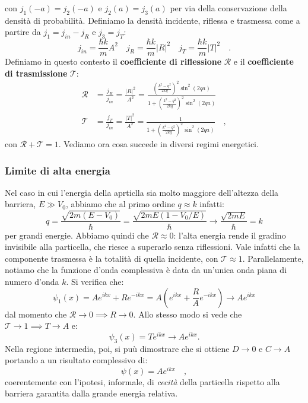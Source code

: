 con $j_1(-a) = j_2(-a)$ e $j_2(a) = j_3(a)$ per via della conservazione della densità di probabilità. Definiamo la densità incidente, riflessa e trasmessa come a partire da $j_1 = j_{in} - j_R$ e $j_3 = j_T$:
\[
    j_{in} = \frac{\hbar k}{m} A^2 \quad j_R = \frac{\hbar k}{m} |R|^2 \quad j_T = \frac{\hbar k}{m} |T|^2 \quad. 
\]
Definiamo in questo contesto il \textbf{coefficiente di riflessione} $\mathcal{R}$ e il \textbf{coefficiente di trasmissione} $\mathcal{T}$:
\[
\begin{aligned}
    \mathcal{R} &= \frac{j_R}{j_{in}} = \frac{|R|^2}{A^2} = \frac{\left( \frac{k^2-q^2}{2kq} \right)^2 \sin^2(2qa)}{1 + \left( \frac{k^2-q^2}{2kq} \right)^2 \sin^2(2qa)} \\
    \mathcal{T} &= \frac{j_T}{j_{in}} = \frac{|T|^2}{A^2} = \frac{1}{1 + \left( \frac{k^2-q^2}{2kq} \right)^2 \sin^2(2qa)} \quad,
\end{aligned}
\]
con $\mathcal{R} + \mathcal{T} = 1$. Vediamo ora cosa succede in diversi regimi energetici.

\subsubsection{Limite di alta energia}
Nel caso in cui l'energia della aprticlla sia molto maggiore dell'altezza della barriera, $E \gg V_0$, abbiamo che al primo ordine $q \approx k$ infatti:
\[
    q = \frac{\sqrt{2m(E-V_0)}}{\hbar} = \frac{\sqrt{2mE(1-V_0/E)}}{\hbar} \to \frac{\sqrt{2mE}}{\hbar} = k 
\]
per grandi energie. Abbiamo quindi che $\mathcal{R} \approx 0$: l'alta energia rende il gradino invisibile alla particella, che riesce a superarlo senza riflessioni. Vale infatti che la componente trasmessa è la totalità di quella incidente, con $\mathcal{T} \approx 1$. Parallelamente, notiamo che la funzione d'onda complessiva è data da un'unica onda piana di numero d'onda $k$. Si verifica che:
\[
    \psi_1(x) = Ae^{ikx} + Re^{-ikx} = A\left( e^{ikx} + \frac{R}{A} e^{-ikx} \right) \to Ae^{ikx} 
\] 
dal momento che $\mathcal{R} \to 0 \implies R \to 0$. Allo stesso modo si vede che $\mathcal{T} \to 1 \implies T \to A$ e:
\[
    \psi_3(x) = Te^{ikx} \to Ae^{ikx}.
\] 
Nella regione intermedia, poi, si puù dimostrare che si ottiene $D \to 0$ e $C \to A$ portando a un risultato complessivo di:
\[
    \psi(x) = Ae^{ikx} \quad,
\]
coerentemente con l'ipotesi, informale, di \emph{cecità} della particella rispetto alla barriera garantita dalla grande energia relativa.

